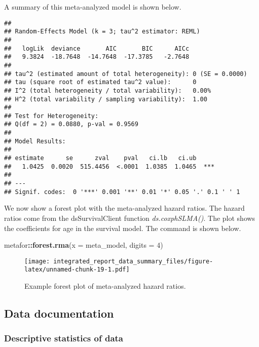 \documentclass[
]{article}
\newenvironment{Shaded}{\begin{snugshade}}{\end{snugshade}}
\newcommand{\DataTypeTok}[1]{\textcolor[rgb]{0.13,0.29,0.53}{#1}}
\newcommand{\DecValTok}[1]{\textcolor[rgb]{0.00,0.00,0.81}{#1}}
\newcommand{\KeywordTok}[1]{\textcolor[rgb]{0.13,0.29,0.53}{\textbf{#1}}}
\newcommand{\NormalTok}[1]{#1}
\newcommand{\OperatorTok}[1]{\textcolor[rgb]{0.81,0.36,0.00}{\textbf{#1}}}
\begin{document}
A summary of this meta-analyzed model is shown below.

\begin{verbatim}
## 
## Random-Effects Model (k = 3; tau^2 estimator: REML)
## 
##   logLik  deviance       AIC       BIC      AICc 
##   9.3824  -18.7648  -14.7648  -17.3785   -2.7648   
## 
## tau^2 (estimated amount of total heterogeneity): 0 (SE = 0.0000)
## tau (square root of estimated tau^2 value):      0
## I^2 (total heterogeneity / total variability):   0.00%
## H^2 (total variability / sampling variability):  1.00
## 
## Test for Heterogeneity:
## Q(df = 2) = 0.0880, p-val = 0.9569
## 
## Model Results:
## 
## estimate      se      zval    pval   ci.lb   ci.ub 
##   1.0425  0.0020  515.4456  <.0001  1.0385  1.0465  *** 
## 
## ---
## Signif. codes:  0 '***' 0.001 '**' 0.01 '*' 0.05 '.' 0.1 ' ' 1
\end{verbatim}

We now show a forest plot with the meta-analyzed hazard ratios. The
hazard ratios come from the dsSurvivalClient function
\emph{ds.coxphSLMA()}. The plot shows the coefficients for age in the
survival model. The command is shown below.

\begin{Shaded}
\begin{Highlighting}[]
\NormalTok{metafor}\OperatorTok{::}\KeywordTok{forest.rma}\NormalTok{(}\DataTypeTok{x =}\NormalTok{ meta_model, }\DataTypeTok{digits =} \DecValTok{4}\NormalTok{) }
\end{Highlighting}
\end{Shaded}

\begin{figure}
\centering
\texttt{[image: integrated\_report\_data\_summary\_files/figure-latex/unnamed-chunk-19-1.pdf]}
\caption{Example forest plot of meta-analyzed hazard ratios.}
\end{figure}

\hypertarget{data-documentation}{%
\subsection{Data documentation}\label{data-documentation}}

\hypertarget{descriptive-statistics-of-data}{%
\subsubsection{Descriptive statistics of
data}\label{descriptive-statistics-of-data}}
\end{document}
